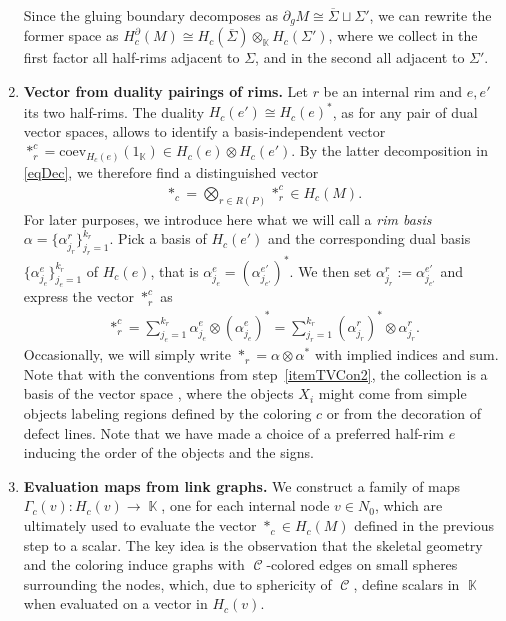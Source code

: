 \documentclass[10pt,a4paper]{amsart}
\DeclareMathOperator{\Hom}{Hom}
\DeclareMathOperator{\K}{\mathbb{K}}
\DeclareMathOperator{\calc}{\mathcal{C}}
\numberwithin{equation}{section}
\theoremstyle{definition}
\begin{document}
\begin{enumerate}
 Since the gluing boundary decomposes as $\partial_gM \cong \overline{\Sigma} \sqcup \Sigma'$, we can rewrite the former space as $H_c^{\partial}(M) \cong H_c(\overline{\Sigma}) \otimes_{\K} H_c(\Sigma')$, where we collect in the first factor all half-rims adjacent to $\Sigma$, and in the second all adjacent to $\Sigma'$.
 \item \textbf{Vector from duality pairings of rims.} Let $r$ be an internal rim and $e, e'$ its two half-rims. The duality $H_c(e') \cong H_c(e)^*$, as for any pair of dual vector spaces, allows to identify a basis-independent vector $*_r^c = \mathrm{coev}_{H_c(e)}(1_{\K}) \in H_c(e) \otimes H_c(e')$. By the latter decomposition in \eqref{eqDec}, we therefore find a distinguished vector
 \begin{align*}
 *_c = \bigotimes_{r \in R(P)} *_r^c \in H_c(M).
 \end{align*}
 For later purposes, we introduce here what we will call a \textit{rim basis} $\alpha = \{\alpha_{j_r}^r\}_{j_r=1}^{k_r}$. Pick a basis  of $H_c(e')$ and the corresponding dual basis $\{\alpha_{j_{e}}^{e}\}_{j_{e}=1}^{k_r}$ of $H_c(e)$, that is $\alpha_{j_e}^e = (\alpha_{j_{e'}}^{e'})^* $. We then set $\alpha_{j_r}^r := \alpha_{j_{e'}}^{e'}$ and express the vector $*_r^c$ as
 \begin{align*}
 *_r^c = \sum_{j_e = 1}^{k_r} \alpha_{j_e}^e \otimes (\alpha_{j_e}^e)^* = \sum_{j_r = 1}^{k_r} (\alpha_{j_r}^r)^*\otimes \alpha_{j_r}^r.
 \end{align*}
 Occasionally, we will simply write $*_r = \alpha \otimes \alpha^*$ with implied indices and sum. Note that with the conventions from step~\ref{itemTVCon2}, the collection  is a basis of the vector space \smash{$ \Hom_{\calc}\bigl(X_1^{\varepsilon(1)} \otimes \dots \otimes X_k^{\varepsilon(k)}, \mathbbm{1}\bigr)$}, where the objects $X_i$ might come from simple objects labeling regions defined by the coloring $c$ or from the decoration of defect lines. Note that we have made a choice of a preferred half-rim $e$ inducing the order of the objects and the signs.
 \item \textbf{Evaluation maps from link graphs.} We construct a family of maps $\Gamma_c(v)\colon H_c(v) \rightarrow \K$, one for each internal node $v \in N_0$, which are ultimately used to evaluate the vector $*_c \in H_c(M)$ defined in the previous step to a scalar. The key idea is the observation that the skeletal geometry and the coloring induce graphs with $\calc$-colored edges on small spheres surrounding the nodes, which, due to sphericity of $\calc$, define scalars in $\K$ when evaluated on a vector in $H_c(v)$.


\end{enumerate}
\end{document}
